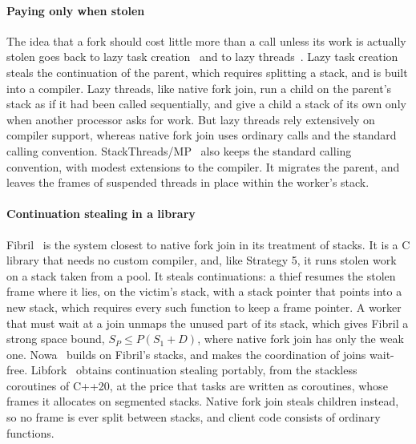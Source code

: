 \documentclass[sigplan,nonacm]{acmart}
\begin{document}
\paragraph{Paying only when stolen}
%
The idea that a fork should cost little more than a call unless its
work is actually stolen goes back to lazy task
creation~\cite{mohr1991lazy} and to lazy
threads~\cite{goldstein1996lazythreads}.
%
Lazy task creation steals the continuation of the parent, which
requires splitting a stack, and is built into a compiler.
%
Lazy threads, like native fork join, run a child on the parent's stack
as if it had been called sequentially, and give a child a stack of its
own only when another processor asks for work.
%
But lazy threads rely extensively on compiler support, whereas native
fork join uses ordinary calls and the standard calling convention.
%
StackThreads/MP~\cite{taura1999stackthreads} also keeps the standard
calling convention, with modest extensions to the compiler.
%
It migrates the parent, and leaves the frames of suspended threads in
place within the worker's stack.

\paragraph{Continuation stealing in a library}
%
Fibril~\cite{yang2016fibril} is the system closest to native fork join
in its treatment of stacks.
%
It is a C library that needs no custom compiler, and, like Strategy 5,
it runs stolen work on a stack taken from a pool.
%
It steals continuations: a thief resumes the stolen frame where it
lies, on the victim's stack, with a stack pointer that points into a
new stack, which requires every such function to keep a frame pointer.
%
A worker that must wait at a join unmaps the unused part of its stack,
which gives Fibril a strong space bound, $S_P \le P(S_1 + D)$, where
native fork join has only the weak one.
%
Nowa~\cite{schmaus2021nowa} builds on Fibril's stacks, and makes the
coordination of joins wait-free.
%
Libfork~\cite{williams2025libfork} obtains continuation stealing
portably, from the stackless coroutines of C++20, at the price that
tasks are written as coroutines, whose frames it allocates on segmented
stacks.
%
Native fork join steals children instead, so no frame is ever split
between stacks, and client code consists of ordinary functions.
\end{document}
